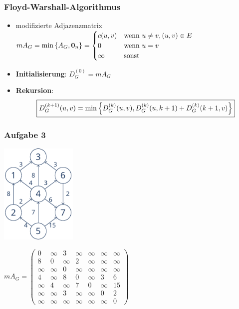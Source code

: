 \documentclass{beamer}
\begin{document}
\begin{frame} \frametitle{Floyd-Warshall-Algorithmus}
	\begin{itemize}
		\item modifizierte Adjazenzmatrix $mA_G = \min\left\{ A_G, \mathbf{0}_n \right\} = \begin{cases}
		c(u,v) & \text{wenn } u \neq v, (u,v) \in E \\
		0 & \text{wenn } u = v \\
		\infty & \text{sonst}
		\end{cases}$
		\item \textbf{Initialisierung}: $D_G^{(0)} = mA_G$
		\item \textbf{Rekursion}:
		\begin{equation*}
			\boxed{D_G^{(k+1)}(u,v) = \min\left\{ D_G^{(k)}(u,v) , D_G^{(k)}(u,k+1) + D_G^{(k)}(k+1,v) \right\}}
		\end{equation*}
	\end{itemize}
\end{frame}
\begin{frame} \frametitle{Aufgabe 3}
	\begin{minipage}{\dimexpr0.42\linewidth-\fboxrule-\fboxsep}
		\includegraphics[height=13em]{./tut11_task3-graph.pdf}
	\end{minipage}
	\pause
	\begin{minipage}{\dimexpr0.58\linewidth-\fboxrule-\fboxsep}
		\small
		$mA_G = \begin{pmatrix}
		0      & \infty & 3      & \infty & \infty & \infty & \infty \\
		8      & 0      & \infty & 2      & \infty & \infty & \infty \\
		\infty & \infty & 0      & \infty & \infty & \infty & \infty \\
		4      & \infty & 8      & 0      & \infty & 3      & 6      \\
		\infty & 4      & \infty & 7      & 0      & \infty & 15     \\
		\infty & \infty & 3      & \infty & \infty & 0      & 2      \\
		\infty & \infty & \infty & \infty & \infty & \infty & 0
		\end{pmatrix}$
	\end{minipage}
\end{frame}
\end{document}
